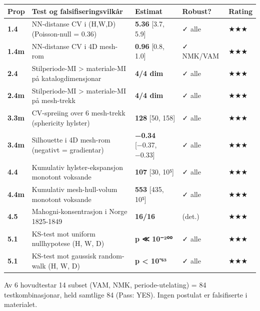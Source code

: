 \begin{widebody}
\begin{footnotesize}
\begin{tabular}{lp{5cm}lll}
\hline
\textbf{Prop} & \textbf{Test og falsifiseringsvilkår} & \textbf{Estimat} & \textbf{Robust?} & \textbf{Rating} \\
\hline
\textbf{1.4} & NN-distanse CV i (H,W,D) (Poisson-null = 0.36) & \textbf{5.36} [3.7, 5.9] & ✓ alle & ★★★ \\
\textbf{1.4m} & NN-distanse CV i 4D mesh-rom & \textbf{0.96} [0.8, 1.0] & ✓ NMK/VAM & ★★★ \\
\textbf{2.4} & Stilperiode-MI > materiale-MI på katalogdimensjonar & \textbf{4/4 dim} & ✓ alle & ★★★ \\
\textbf{2.4m} & Stilperiode-MI > materiale-MI på mesh-trekk & \textbf{4/4 dim} & ✓ alle & ★★★ \\
\textbf{3.3m} & CV-spreiing over 6 mesh-trekk (sphericity \msym{→} hylster) & \textbf{128\msym{×}} [50, 158] & ✓ alle & ★★★ \\
\textbf{3.4m} & Silhouette i 4D mesh-rom (negativt = gradientar) & \textbf{−0.34} [−0.37, −0.33] & ✓ alle & ★★★ \\
\textbf{4.4} & Kumulativ hylster-ekspansjon monotont voksande & \textbf{107\msym{×}} [30, 10⁵] & ✓ alle & ★★★ \\
\textbf{4.4m} & Kumulativ mesh-hull-volum monotont voksande & \textbf{553\msym{×}} [435, 10⁵] & ✓ alle & ★★★ \\
\textbf{4.5} & Mahogni-konsentrasjon i Norge 1825-1849 & \textbf{16/16} & (det.) & ★★★ \\
\textbf{5.1} & KS-test mot uniform nullhypotese (H, W, D) & \textbf{p ≪ 10⁻²⁰⁰} & ✓ alle & ★★★ \\
\textbf{5.1} & KS-test mot gaussisk random-walk (H, W, D) & \textbf{p < 10⁻⁶³} & ✓ alle & ★★★ \\
\hline
\end{tabular}
\end{footnotesize}

\par\addvspace{4pt}
Av 6 hovudtestar  14 subset (VAM, NMK, periode-utelating) = 84 testkombinasjonar, held samtlige 84 (Pass: YES). Ingen postulat er falsifiserte i materialet.
\end{widebody}

